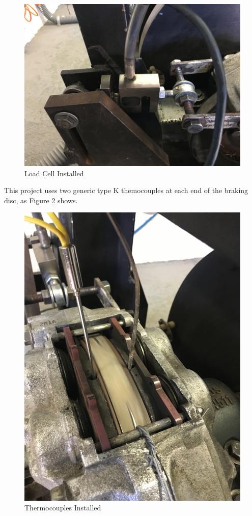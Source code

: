 		\begin{figure}[htbp]
			\centering
			\includegraphics[width=.7\textwidth]{figuras/fig-load-cell-installed}
			\caption{Load Cell Installed}
			\label{fig:load-cell-installed}
		\end{figure}
		\par

		This project uses two generic type K themocouples at each end of the braking disc, as Figure \ref{fig:thermocouple-installation} shows.

		\begin{figure}[htbp]
			\centering
			\includegraphics[width=.7\textwidth, angle=270]{figuras/fig-thermocouple-installation}
			\caption{Thermocouples Installed}
			\label{fig:thermocouple-installation}
		\end{figure}
		\par


